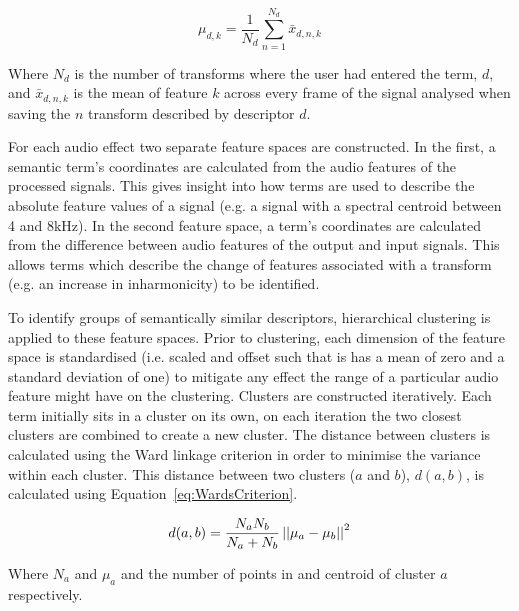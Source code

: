 		\begin{equation}
			\mu_{d,k} = \frac{1}{N_{d}} \sum_{n = 1}^{N_{d}} \bar{x}_{d,n,k}
			\label{eq:FeatureSpaceCoords}
		\end{equation}

		Where $N_{d}$ is the number of transforms where the user had entered the term, $d$, and $\bar{x}_{d,n,k}$
		is the mean of feature $k$ across every frame of the signal analysed when saving the $n$
		transform described by descriptor $d$.
		
		For each audio effect two separate feature spaces are constructed. In the first, a semantic term's
		coordinates are calculated from the audio features of the processed signals. This gives insight into how
		terms are used to describe the absolute feature values of a signal (e.g. a signal with a spectral centroid
		between 4 and 8kHz). In the second feature space, a term's coordinates are calculated from the difference
		between audio features of the output and input signals. This allows terms which describe the change of
		features associated with a transform (e.g. an increase in inharmonicity) to be identified.

		To identify groups of semantically similar descriptors, hierarchical clustering is applied to these feature
		spaces. Prior to clustering, each dimension of the feature space is standardised (i.e. scaled and offset
		such that is has a mean of zero and a standard deviation of one) to mitigate any effect the range of a
		particular audio feature might have on the clustering. Clusters are constructed iteratively. Each term
		initially sits in a cluster on its own, on each iteration the two closest clusters are combined to create a
		new cluster. The distance between clusters is calculated using the Ward linkage criterion
		\citep{ward1963hierarchical} in order to minimise the variance within each cluster. This distance between
		two clusters ($a$ and $b$), $d(a, b)$, is calculated using Equation~\ref{eq:WardsCriterion}.

		\begin{equation}
			d(a, b) = \frac{N_{a}N_{b}}{N_{a} + N_{b}} \left|\left|\mu_{a} - \mu_{b}\right|\right|^{2}
			\label{eq:WardsCriterion}
		\end{equation}

		Where $N_{a}$ and $\mu_{a}$ and the number of points in and centroid of cluster $a$ respectively.

